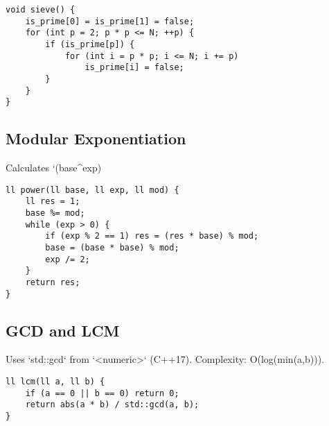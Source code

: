 \documentclass[10pt]{article}
\begin{document}
\begin{multicols}{2}
\begin{lstlisting}
void sieve() {
    is_prime[0] = is_prime[1] = false;
    for (int p = 2; p * p <= N; ++p) {
        if (is_prime[p]) {
            for (int i = p * p; i <= N; i += p)
                is_prime[i] = false;
        }
    }
}
\end{lstlisting}

\subsection{Modular Exponentiation}
Calculates `(base^exp) %

\begin{lstlisting}
ll power(ll base, ll exp, ll mod) {
    ll res = 1;
    base %= mod;
    while (exp > 0) {
        if (exp % 2 == 1) res = (res * base) % mod;
        base = (base * base) % mod;
        exp /= 2;
    }
    return res;
}
\end{lstlisting}

\subsection{GCD and LCM}
Uses `std::gcd` from `<numeric>` (C++17). Complexity: O(log(min(a,b))).

\begin{lstlisting}
ll lcm(ll a, ll b) {
    if (a == 0 || b == 0) return 0;
    return abs(a * b) / std::gcd(a, b);
}
\end{lstlisting}

\end{multicols}
\end{document}
